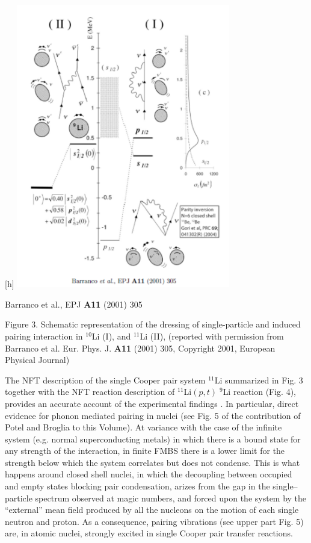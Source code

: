 \documentclass[a4paper,14pt]{book}
\begin{document}
\begin{center}[h]
	\hspace{-1cm}\includegraphics[width=0.7\textwidth]{figs_C4S/fig_litio}
\end{center}
\vspace{-0.5cm}
\begin{center}
 		Barranco et al., EPJ \textbf{A11} (2001) 305
\end{center}
\begin{footnotesize}
	\begin{center}
		Figure 3. Schematic representation of the dressing of single-particle and induced pairing interaction in $^{10}$Li (I), and $^{11}$Li (II), (reported with permission from Barranco et al. Eur. Phys. J. \textbf{A11} (2001) 305, Copyright 2001, European Physical Journal)
	\end{center}
\end{footnotesize}

The NFT description of the single Cooper pair system ${}^{11}$Li summarized in Fig. 3 together with the NFT reaction description of ${}^{11}$Li$(p,t) \;{}^9$Li reaction (Fig. 4), provides
\cite{Potel:10} an accurate account of the experimental findings\cite{Tanihata:08} . In particular, direct evidence for phonon mediated pairing in nuclei (see Fig. 5 of the contribution of Potel and Broglia to this Volume). At variance with the case of the infinite system (e.g. normal superconducting metals) in which there is a bound state for any strength of the interaction, in finite FMBS there is a lower limit for the strength below which the system correlates but does not condense. This is what happens around closed shell nuclei, in which the decoupling between occupied and empty states blocking pair condensation, arizes from the gap in the single--particle spectrum observed at magic numbers, and forced upon the system by the ``external'' mean field produced by all the nucleons on the motion of each single neutron and proton. As a consequence, pairing vibrations (see upper part Fig. 5) are, in atomic nuclei, strongly excited in single Cooper pair transfer reactions.
\end{document}

